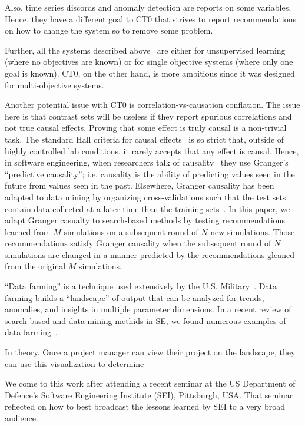 \documentclass[runningheads]{llncs}
\begin{document}
{Also, time series discords and anomaly detection are reports
on some variables. Hence, they have a different goal to CT0 that
strives to report recommendations on how to change the system
so to remove some problem. 

Further, all the systems described
above~\cite{voinea07,horvitz05,keogh05,gruska10} are
either for unsupervised learning (where no
objectives are known) or for single objective
systems (where only one goal is known). CT0, on the
other hand, is more ambitious since it was designed
for multi-objective systems.

Another potential issue with CT0 is
correlation-vs-causation conflation. The issue here
is that contrast sets will be useless if they
report spurious correlations and not true causal
effects.  Proving that some effect is truly causal
is a non-trivial task.  The standard Hall criteria
for causal effects~\cite{paul13} is so strict that,
outside of highly controlled lab conditions, it
rarely accepts that any effect is causal.  Hence, in
software engineering, when researchers talk of
causality~\cite{couto14,zheng14z,huber09,bhat!icse12}
they use Granger's ``predictive causality'';
i.e. causality is the ability of predicting
values seen in the future from values seen in the
past.  Elsewhere, Granger causality has been adapted
to data mining by organizing cross-validations such
that the test sets contain data collected at a later
time than the training sets~\cite{me11f}.  In this
paper, we adapt Granger casualty to search-based
methods by testing recommendations learned from $M$
simulations on a subsequent round of $N$ new
simulations.  Those recommendations satisfy Granger
causality when the subsequent round of $N$
simulations are changed in a manner predicted by the
recommendations gleaned from the original $M$
simulations.

``Data farming'' is a technique used extensively by the
U.S. Military~\cite{meyer04}.
Data farming builds a ``landscape''
of output that can be analyzed for trends, anomalies, and insights in
multiple parameter dimensions.  
In  a recent review of search-based and data mining methids in SE,
we found numerous examples
of data farming~\cite{strickland03,Myrtveit,Shepperd01,pearce99,vanlamsweerde98integrating,chung00,me03j,heaven11,rodriguez11,jian09}.

In theory. Once a project manager can view their project on the landscape,
they can use this visualization to determine

We come to this work after attending a recent seminar at the US 
Department of Defence's Software Engineering Institute (SEI), Pittsburgh, USA.
That seminar reflected on how to best broadcast the lessons learned by SEI
to a very broad audience.

}
\end{document}

